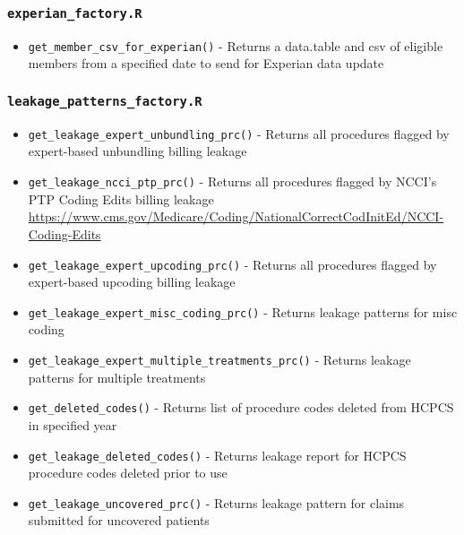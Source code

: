 \documentclass[
]{book}
\providecommand{\tightlist}{%
  \setlength{\itemsep}{0pt}\setlength{\parskip}{0pt}}
\begin{document}
\hypertarget{experian_factory.r}{%
\subsubsection{\texorpdfstring{\texttt{experian\_factory.R}}{experian\_factory.R}}\label{experian_factory.r}}

\begin{itemize}
\tightlist
\item
  \texttt{get\_member\_csv\_for\_experian()} - Returns a data.table and csv of eligible members from a specified date to send for Experian data update
\end{itemize}

\hypertarget{leakage_patterns_factory.r}{%
\subsubsection{\texorpdfstring{\texttt{leakage\_patterns\_factory.R}}{leakage\_patterns\_factory.R}}\label{leakage_patterns_factory.r}}

\begin{itemize}
\tightlist
\item
  \texttt{get\_leakage\_expert\_unbundling\_prc()} - Returns all procedures flagged by expert-based unbundling billing leakage
\item
  \texttt{get\_leakage\_ncci\_ptp\_prc()} - Returns all procedures flagged by NCCI's PTP Coding Edits billing leakage \url{https://www.cms.gov/Medicare/Coding/NationalCorrectCodInitEd/NCCI-Coding-Edits}
\item
  \texttt{get\_leakage\_expert\_upcoding\_prc()} - Returns all procedures flagged by expert-based upcoding billing leakage
\item
  \texttt{get\_leakage\_expert\_misc\_coding\_prc()} - Returns leakage patterns for misc coding
\item
  \texttt{get\_leakage\_expert\_multiple\_treatments\_prc()} - Returns leakage patterns for multiple treatments
\item
  \texttt{get\_deleted\_codes()} - Returns list of procedure codes deleted from HCPCS in specified year
\item
  \texttt{get\_leakage\_deleted\_codes()} - Returns leakage report for HCPCS procedure codes deleted prior to use
\item
  \texttt{get\_leakage\_uncovered\_prc()} - Returns leakage pattern for claims submitted for uncovered patients
\end{itemize}
\end{document}
